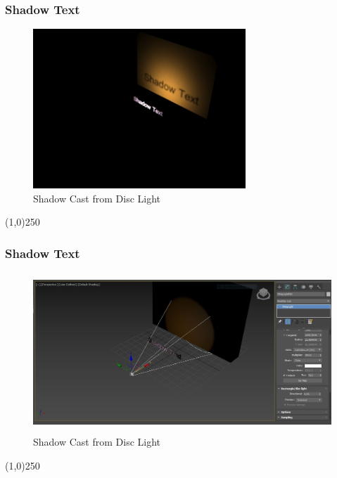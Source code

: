 \begin{frame}
\frametitle{Shadow Text}
\begin{figure}
	\centering
	\includegraphics[height=6.0cm]{./Lights/ShadowTextRender}
	\caption{Shadow Cast from Disc Light}
	\label{fig:DiscShadowRender}
\end{figure}
\end{frame}
\begin{center}\line(1,0){250}\end{center}


\begin{frame}
\frametitle{Shadow Text}
\begin{figure}
	\centering
	\includegraphics[height=6.0cm]{./Lights/ShadowText}
	\caption{Shadow Cast from Disc Light}
	\label{fig:DiscShadow}
\end{figure}
\end{frame}
\begin{center}\line(1,0){250}\end{center}









